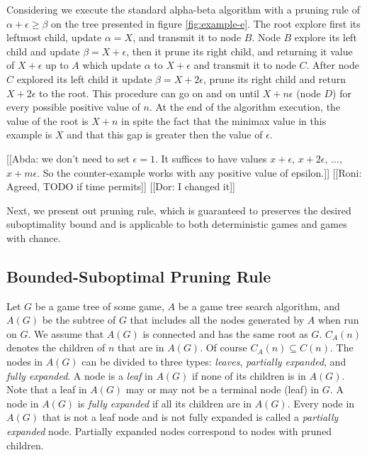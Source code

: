 \documentclass[letterpaper]{article} %
\begin{document}
Considering we execute the standard alpha-beta algorithm with a pruning rule of $\alpha+\epsilon \geq \beta$ on the tree presented in figure \ref{fig:example-e}.
The root explore first its leftmost child, update $\alpha=X$, and transmit it to node $B$. Node $B$ explore its left child and update $\beta=X+\epsilon$, then it prune its right child, and returning it value of $X+\epsilon$ up to $A$ which update $\alpha$ to $X+\epsilon$ and transmit it to node $C$. After node $C$ explored its left child it update $\beta=X+2\epsilon$, prune its right child and return $X+2\epsilon$ to the root. This procedure can go on and on until $X+n\epsilon$ (node $D$) for every possible positive value of $n$. At the end of the algorithm execution, the value of the root is $X+n$ in spite the fact that the minimax value in this example is $X$ and that this gap is greater then the value of $\epsilon$.

[[Abda: we don't need to set $\epsilon = 1$. It suffices to have values $x+\epsilon$, $x+2\epsilon$, ..., $x+m\epsilon$. So the counter-example works with any positive value of epsilon.]]
[[Roni: Agreed, TODO if time permits]] [[Dor: I changed it]]

Next, we present out pruning rule, which is guaranteed to preserves the desired suboptimality bound and is applicable to both deterministic games and games with chance. 

\subsection{Bounded-Suboptimal Pruning Rule}
Let $G$ be a game tree of some game, $A$ be a game tree search algorithm, and $A(G)$ be the subtree of $G$ that includes all the nodes generated by $A$ when run on $G$.
We assume that $A(G)$ is connected and has the same root as $G$. 
$C_A(n)$ denotes the children of $n$ that are in $A(G)$. Of course $C_A(n)\subseteq C(n)$.  
The nodes in $A(G)$ can be divided to three types: \emph{leaves}, \emph{partially expanded}, and \emph{fully expanded}.
A node is a \emph{leaf} in $A(G)$ if none of its children is in $A(G)$.
Note that a leaf in $A(G)$ may or may not be a terminal node (leaf) in $G$.  
A node in $A(G)$ is \emph{fully expanded} if all its children are in $A(G)$.
Every node in $A(G)$ that is not a leaf node and is not fully expanded is called a \emph{partially expanded} node. 
Partially expanded nodes correspond to nodes with pruned children. 
\end{document}
